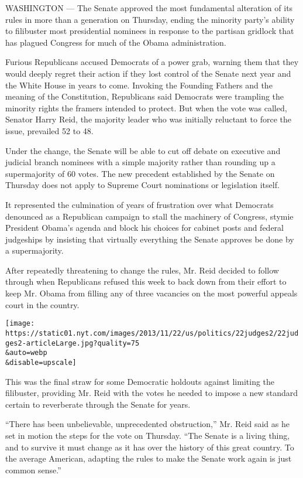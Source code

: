 WASHINGTON --- The Senate approved the most fundamental alteration of
its rules in more than a generation on Thursday, ending the minority
party's ability to filibuster most presidential nominees in response to
the partisan gridlock that has plagued Congress for much of the Obama
administration.

Furious Republicans accused Democrats of a power grab, warning them that
they would deeply regret their action if they lost control of the Senate
next year and the White House in years to come. Invoking the Founding
Fathers and the meaning of the Constitution, Republicans said Democrats
were trampling the minority rights the framers intended to protect. But
when the vote was called, Senator Harry Reid, the majority leader who
was initially reluctant to force the issue, prevailed 52 to 48.

Under the change, the Senate will be able to cut off debate on executive
and judicial branch nominees with a simple majority rather than rounding
up a supermajority of 60 votes. The new precedent established by the
Senate on Thursday does not apply to Supreme Court nominations or
legislation itself.

It represented the culmination of years of frustration over what
Democrats denounced as a Republican campaign to stall the machinery of
Congress, stymie President Obama's agenda and block his choices for
cabinet posts and federal judgeships by insisting that virtually
everything the Senate approves be done by a supermajority.

After repeatedly threatening to change the rules, Mr. Reid decided to
follow through when Republicans refused this week to back down from
their effort to keep Mr. Obama from filling any of three vacancies on
the most powerful appeals court in the country.

\texttt{[image: https://static01.nyt.com/images/2013/11/22/us/politics/22judges2/22judges2-articleLarge.jpg?quality=75\\\&auto=webp\\\&disable=upscale]}

This was the final straw for some Democratic holdouts against limiting
the filibuster, providing Mr. Reid with the votes he needed to impose a
new standard certain to reverberate through the Senate for years.

``There has been unbelievable, unprecedented obstruction,'' Mr. Reid
said as he set in motion the steps for the vote on Thursday. ``The
Senate is a living thing, and to survive it must change as it has over
the history of this great country. To the average American, adapting the
rules to make the Senate work again is just common sense.''

